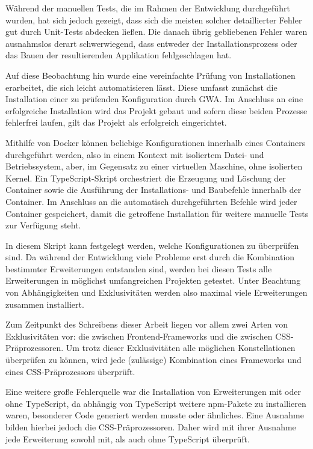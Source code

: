 Während der manuellen Tests, die im Rahmen der Entwicklung durchgeführt wurden, hat sich jedoch gezeigt, dass sich die meisten solcher detaillierter Fehler gut durch Unit-Tests abdecken ließen. Die danach übrig gebliebenen Fehler waren ausnahmslos derart schwerwiegend, dass entweder der Installationsprozess oder das Bauen der resultierenden Applikation fehlgeschlagen hat.

Auf diese Beobachtung hin wurde eine vereinfachte Prüfung von Installationen erarbeitet, die sich leicht automatisieren lässt. Diese umfasst zunächst die Installation einer zu prüfenden Konfiguration durch \gls{GWA}. Im Anschluss an eine erfolgreiche Installation wird das Projekt gebaut und sofern diese beiden Prozesse fehlerfrei laufen, gilt das Projekt als erfolgreich eingerichtet.

Mithilfe von Docker können beliebige Konfigurationen innerhalb eines Containers durchgeführt werden, also in einem Kontext mit isoliertem Datei- und Betriebssystem, aber, im Gegensatz zu einer virtuellen Maschine, ohne isolierten Kernel. Ein TypeScript-Skript orchestriert die Erzeugung und Löschung der Container sowie die Ausführung der Installations- und Baubefehle innerhalb der Container. Im Anschluss an die automatisch durchgeführten Befehle wird jeder Container gespeichert, damit die getroffene Installation für weitere manuelle Tests zur Verfügung steht.

In diesem Skript kann festgelegt werden, welche Konfigurationen zu überprüfen sind. Da während der Entwicklung viele Probleme erst durch die Kombination bestimmter Erweiterungen entstanden sind, werden bei diesen Tests alle Erweiterungen in möglichst umfangreichen Projekten getestet. Unter Beachtung von Abhängigkeiten und Exklusivitäten werden also maximal viele Erweiterungen zusammen installiert.

Zum Zeitpunkt des Schreibens dieser Arbeit liegen vor allem zwei Arten von Exklusivitäten vor: die zwischen Frontend-Frameworks und die zwischen CSS-Präprozessoren. Um trotz dieser Exklusivitäten alle möglichen Konstellationen überprüfen zu können, wird jede (zulässige) Kombination eines Frameworks und eines CSS-Präprozessors überprüft.

Eine weitere große Fehlerquelle war die Installation von Erweiterungen mit oder ohne TypeScript, da abhängig von TypeScript weitere \gls{npm}-Pakete zu installieren waren, besonderer Code generiert werden musste oder ähnliches. Eine Ausnahme bilden hierbei jedoch die CSS-Präprozessoren. Daher wird mit ihrer Ausnahme jede Erweiterung sowohl mit, als auch ohne TypeScript überprüft.

